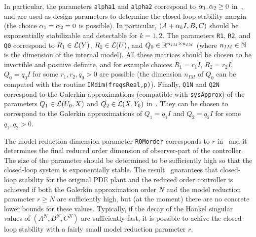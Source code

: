 \documentclass[11pt, a4paper]{amsart}
\theoremstyle{definition}
\numberwithin{equation}{section}
\begin{document}
\begin{itemize}
In particular, the parameters \texttt{alpha1} and \texttt{alpha2} correspond to $\alpha_1,\alpha_2\geq 0$ in~, and are used as design parameters to determine the closed-loop stability margin (the choice $\alpha_1=\alpha_2=0$ is possible). In particular, $(A+\alpha_k I,B,C)$ should be exponentially stabilizable and detectable for $k=1,2$.
The parameters 
\texttt{R1}, \texttt{R2}, and \texttt{Q0} correspond to $R_1\in {\mathcal{L}}(Y)$, $R_2\in {\mathcal{L}}(U)$, and $Q_0\in {\mathbb{R}}^{n_{IM}\times n_{IM}}$ (where $n_{IM}\in {\mathbb{N}}$ is the dimension of the internal model). All these matrices should be chosen to be invertible and positive definite, and for example choices $R_1=r_1 I$, $R_2=r_2 I$, $Q_0=q_0 I$ for some $r_1,r_2,q_0>0$ are possible
 (the dimension $n_{IM}$ of $Q_0$ can be computed with the routine \texttt{IMdim(freqsReal,p)}). Finally,
\texttt{Q1N} and \texttt{Q2N} correspond to  the Galerkin approximations (compatible with \texttt{sysApprox}) of the parameters $Q_1\in {\mathcal{L}}(U_0,X)$ and $Q_2\in {\mathcal{L}}(X,Y_0)$ in~. They
can be chosen to correspond to the Galerkin approximations of $Q_1=q_1 I$ and $Q_2=q_2 I$ for some  $q_1,q_2>0$.

The model reduction dimension parameter \texttt{ROMorder} corresponds to $r$ in~ and it determines the final reduced order dimension of observer-part of the controller. The size of the parameter should be determined to be sufficiently high so that the closed-loop system is exponentially stable. The result~ guarantees that closed-loop stability for the original PDE plant and the reduced order controller is achieved if both the Galerkin approximation order $N$ and the model reduction parameter $r\geq N$ are sufficiently high, but (at the moment) there are no concrete lower bounds for these values. Typically, if the decay of the Hankel singular values of $(A^N,B^N,C^N)$ are sufficiently fast, it is possible to achive the closed-loop stability with a fairly small model reduction parameter $r$.




\end{itemize}
\end{document}
